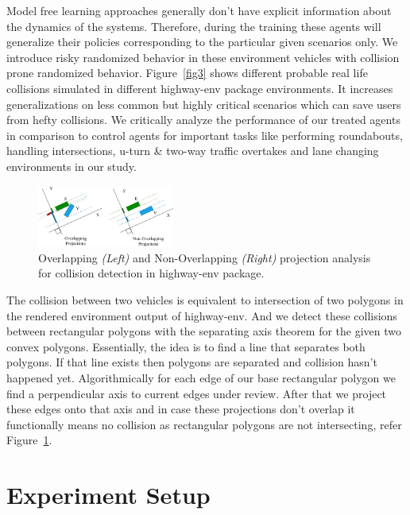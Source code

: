 \documentclass[a4, conference]{IEEEtran}
\begin{document}
    Model free learning approaches generally don't have explicit information about the dynamics of the systems. Therefore, during the training these agents will generalize their policies corresponding to the particular given scenarios only. We introduce risky randomized behavior in these environment vehicles with collision prone randomized behavior. Figure~\ref{fig3} shows different probable real life collisions simulated in different highway-env package environments. It increases generalizations on less common but highly critical scenarios which can save users from hefty collisions. We critically analyze the performance of our treated agents in comparison to control agents for important tasks like performing roundabouts, handling intersections, u-turn \& two-way traffic overtakes and lane changing environments in our study.


    \begin{figure}
        \centering
        \includegraphics[width=0.40\textwidth]{intersect-theorem-diagram.png}
        \caption{Overlapping \textit{(Left)} and Non-Overlapping \textit{(Right)} projection analysis for collision detection in highway-env package.}
        \label{fig4}
    \end{figure}

    The collision between two vehicles is equivalent to intersection of two polygons in the rendered environment output of highway-env. And we detect these collisions between rectangular polygons with the separating axis theorem for the given two convex polygons. Essentially, the idea is to find a line that separates both polygons. If that line exists then polygons are separated and collision hasn't happened yet. Algorithmically for each edge of our base rectangular polygon we find a perpendicular axis to current edges under review. After that we project these edges onto that axis and in case these projections don't overlap it functionally means no collision as rectangular polygons are not intersecting, refer Figure~\ref{fig4}.


\section{Experiment Setup}
\end{document}
